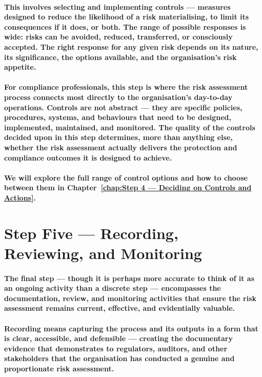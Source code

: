 \paragraph{This involves selecting and implementing controls — measures designed to reduce the likelihood of a risk materialising, to limit its consequences if it does, or both. The range of possible responses is wide: risks can be avoided, reduced, transferred, or consciously accepted. The right response for any given risk depends on its nature, its significance, the options available, and the organisation's risk appetite.}
\paragraph{For compliance professionals, this step is where the risk assessment process connects most directly to the organisation's day-to-day operations. Controls are not abstract — they are specific policies, procedures, systems, and behaviours that need to be designed, implemented, maintained, and monitored. The quality of the controls decided upon in this step determines, more than anything else, whether the risk assessment actually delivers the protection and compliance outcomes it is designed to achieve.}
\paragraph{We will explore the full range of control options and how to choose between them in Chapter~\ref{chap:Step 4 — Deciding on Controls and Actions}.}

\section{Step Five — Recording, Reviewing, and Monitoring}
\paragraph{The final step — though it is perhaps more accurate to think of it as an ongoing activity than a discrete step — encompasses the documentation, review, and monitoring activities that ensure the risk assessment remains current, effective, and evidentially valuable.}
\paragraph{\textbf{Recording} means capturing the process and its outputs in a form that is clear, accessible, and defensible — creating the documentary evidence that demonstrates to regulators, auditors, and other stakeholders that the organisation has conducted a genuine and proportionate risk assessment.}

